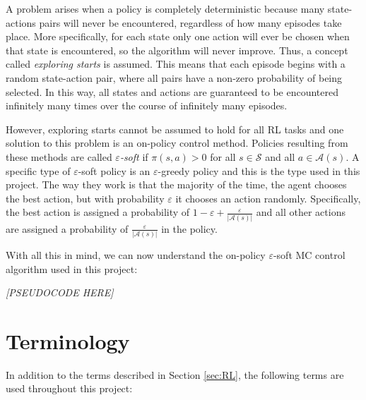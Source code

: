 \documentclass[11pt,a4paper]{report}
\begin{document}
A problem arises when a policy is completely deterministic because many state-actions pairs will never be encountered, regardless of how many episodes take place. More specifically, for each state only one action will ever be chosen when that state is encountered, so the algorithm will never improve. Thus, a concept called \emph{exploring starts} is assumed. This means that each episode begins with a random state-action pair, where all pairs have a non-zero probability of being selected. In this way, all states and actions are guaranteed to be encountered infinitely many times over the course of infinitely many episodes.

However, exploring starts cannot be assumed to hold for all RL tasks and one solution to this problem is an on-policy control method. Policies resulting from these methods are called \emph{$\varepsilon$-soft} if $\pi(s,a) > 0$ for all $s \in \mathcal{S}$ and all $a \in \mathcal{A}(s)$. A specific type of $\varepsilon$-soft policy is an $\varepsilon$-greedy policy and this is the type used in this project. The way they work is that the majority of the time, the agent chooses the best action, but with probability $\varepsilon$ it chooses an action randomly. Specifically, the best action is assigned a probability of $1 - \varepsilon + \frac{\varepsilon}{|\mathcal{A}(s)|}$ and all other actions are assigned a probability of $\frac{\varepsilon}{|\mathcal{A}(s)|}$ in the policy.

With all this in mind, we can now understand the on-policy $\varepsilon$-soft MC control algorithm used in this project:

\label{sec:monteCarloPseudocode}
\begin{center}
	\emph{[PSEUDOCODE HERE]}
\end{center}


\section{Terminology}
\label{sec:Terminology}

In addition to the terms described in Section \ref{sec:RL}, the following terms are used throughout this project:
\end{document}
